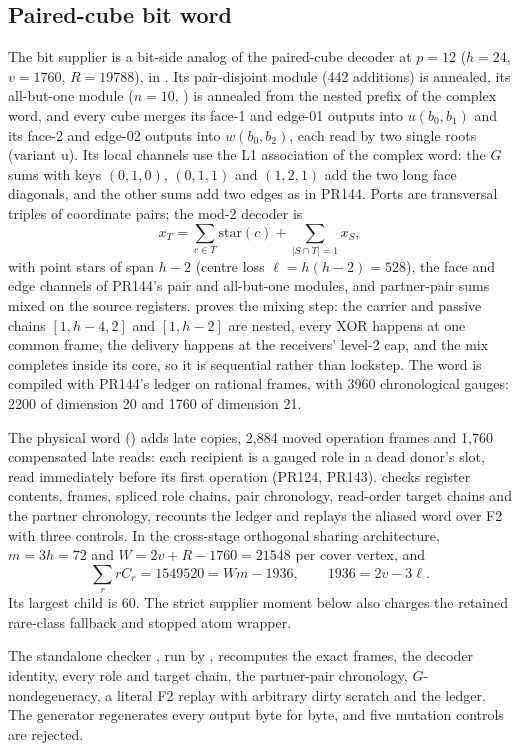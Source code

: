 \subsection{Paired-cube bit word}
The bit supplier is a bit-side analog of the paired-cube decoder at $p=12$
($h=24$, $v=1760$, $R=19788$), in . Its
pair-disjoint module (442 additions) is annealed, its all-but-one module
($n=10$, ) is annealed from
the nested prefix of the complex word, and every cube merges its
face-1 and edge-01 outputs into $u(b_0,b_1)$ and its face-2 and edge-02
outputs into $w(b_0,b_2)$, each read by two single roots (variant u). Its
local channels use the L1 association of the complex word: the $G$ sums with
keys $(0,1,0)$, $(0,1,1)$ and $(1,2,1)$ add the two long face diagonals, and
the other sums add two edges as in PR144. Ports are
transversal triples of coordinate pairs; the mod-2 decoder is
\[
 x_T=\sum_{c\in T}\mathrm{star}(c)+\sum_{|S\cap T|=1}x_S ,
\]
with point stars of span $h-2$ (centre loss $\ell=h(h-2)=528$), the face and
edge channels of PR144's pair and all-but-one modules, and partner-pair sums
mixed on the source registers.  proves
the mixing step: the carrier and passive chains $[1,h-4,2]$ and $[1,h-2]$
are nested, every XOR happens at one common frame, the delivery happens at the
receivers' level-2 cap, and the mix completes inside its core, so it is
sequential rather than lockstep. The word is compiled with PR144's ledger on
rational frames, with 3960 chronological gauges: 2200 of dimension 20 and
1760 of dimension 21.

The physical word () adds late
copies, 2,884 moved operation frames and 1,760 compensated late reads: each
recipient is a gauged role in a dead donor's slot, read immediately before
its first operation (PR124, PR143). 
checks register contents, frames, spliced role chains, pair chronology,
read-order target chains and the partner chronology, recounts the ledger and
replays the aliased word over F2 with three controls.
In the cross-stage orthogonal sharing architecture, $m=3h=72$ and
$W=2v+R-1760=21548$ per cover vertex, and
\[
 \sum_r r C_r=1549520=Wm-1936,\qquad 1936=2v-3\ell.
\]
Its largest child is $60$. The strict supplier moment below also charges the
retained rare-class fallback and stopped atom wrapper.

The standalone checker ,
run by , recomputes the exact frames, the
decoder identity, every role and target chain, the partner-pair chronology,
$G$-nondegeneracy, a literal F2 replay with arbitrary dirty scratch and the
ledger. The generator regenerates every output byte for byte, and five
mutation controls are rejected.
